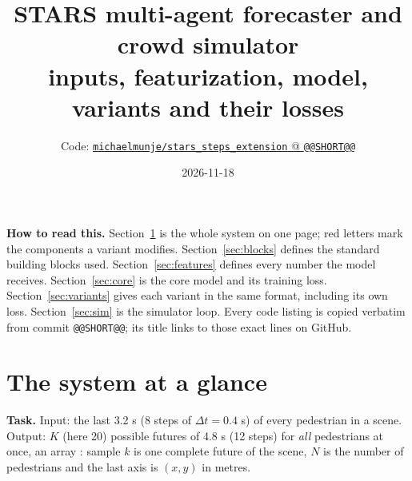 \documentclass[10pt]{article}
\title{STARS multi-agent forecaster and crowd simulator\\[2pt] \large inputs, featurization, model, variants and their losses}
\author{Code: \href{@@REPO@@/tree/@@COMMIT@@}{\texttt{michaelmunje/stars\_steps\_extension} @ \texttt{@@SHORT@@}}}
\date{2026-11-18}
\newcommand{\shape}[1]{{\small\ttfamily [#1]}}
\begin{document}
\maketitle

\noindent\textbf{How to read this.} Section~\ref{sec:overview} is the whole system on one page; red letters
mark the components a variant modifies. Section~\ref{sec:blocks} defines the standard building blocks used.
Section~\ref{sec:features} defines every number the model receives. Section~\ref{sec:core} is the core model and
its training loss. Section~\ref{sec:variants} gives each variant in the same format, including its own loss.
Section~\ref{sec:sim} is the simulator loop. Every code listing is copied verbatim from commit \texttt{@@SHORT@@};
its title links to those exact lines on GitHub.

\tableofcontents

\section{The system at a glance}\label{sec:overview}
\textbf{Task.} Input: the last 3.2 s (8 steps of $\Delta t=0.4$ s) of every pedestrian in a scene. Output:
$K$ (here 20) possible futures of 4.8 s (12 steps) for \emph{all} pedestrians at once, an array
\shape{K, N, 12, 2}: sample $k$ is one complete future of the scene, $N$ is the number of pedestrians and
the last axis is $(x,y)$ in metres.
\end{document}
